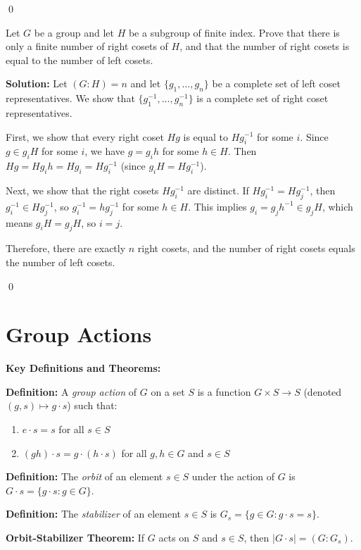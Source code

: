 \qed
\begin{problembox}
Let $G$ be a group and let $H$ be a subgroup of finite index. Prove that there is only a finite number of right cosets of $H$, and that the number of right cosets is equal to the number of left cosets.
\end{problembox}

\noindent\textbf{Solution:} Let $(G : H) = n$ and let $\{g_1, \ldots, g_n\}$ be a complete set of left coset representatives. We show that $\{g_1^{-1}, \ldots, g_n^{-1}\}$ is a complete set of right coset representatives.

First, we show that every right coset $Hg$ is equal to $Hg_i^{-1}$ for some $i$. Since $g \in g_iH$ for some $i$, we have $g = g_ih$ for some $h \in H$. Then $Hg = Hg_ih = Hg_i = Hg_i^{-1}$ (since $g_iH = Hg_i^{-1}$).

Next, we show that the right cosets $Hg_i^{-1}$ are distinct. If $Hg_i^{-1} = Hg_j^{-1}$, then $g_i^{-1} \in Hg_j^{-1}$, so $g_i^{-1} = hg_j^{-1}$ for some $h \in H$. This implies $g_i = g_jh^{-1} \in g_jH$, which means $g_iH = g_jH$, so $i = j$.

Therefore, there are exactly $n$ right cosets, and the number of right cosets equals the number of left cosets.


\qed
\section{Group Actions}

\textbf{Key Definitions and Theorems:}

\textbf{Definition:} A \textit{group action} of $G$ on a set $S$ is a function $G \times S \to S$ (denoted $(g,s) \mapsto g \cdot s$) such that:
\begin{enumerate}
\item $e \cdot s = s$ for all $s \in S$
\item $(gh) \cdot s = g \cdot (h \cdot s)$ for all $g, h \in G$ and $s \in S$
\end{enumerate}

\textbf{Definition:} The \textit{orbit} of an element $s \in S$ under the action of $G$ is $G \cdot s = \{g \cdot s : g \in G\}$.

\textbf{Definition:} The \textit{stabilizer} of an element $s \in S$ is $G_s = \{g \in G : g \cdot s = s\}$.

\textbf{Orbit-Stabilizer Theorem:} If $G$ acts on $S$ and $s \in S$, then $|G \cdot s| = (G : G_s)$.

